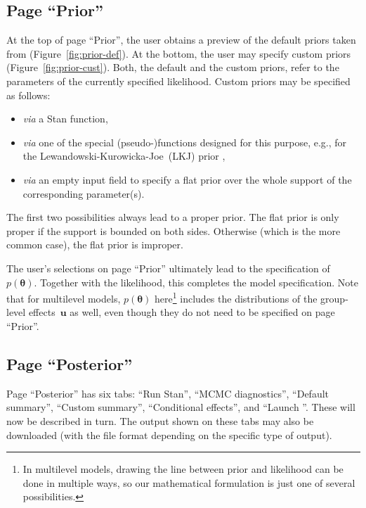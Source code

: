\subsection[Page "Prior"]{Page ``Prior''}
\label{page-prior}

At the top of page ``Prior'', the user obtains a preview of the default
priors taken from  (Figure~\ref{fig:prior-def}). At the bottom, the
user may specify custom priors (Figure~\ref{fig:prior-cust}). Both, the
default and the custom priors, refer to the parameters of the currently
specified likelihood. Custom priors may be specified as follows:
\begin{itemize}
  \item \textit{via} a Stan function,

  \item \textit{via} one of the special  (pseudo-)functions designed
  for this purpose, e.g., for the Le\-wan\-dows\-ki-Ku\-ro\-wic\-ka-Joe~(LKJ) prior
  \citep{lewandowski_generating_2009},

  \item \textit{via} an empty input field to specify a flat prior over the
  whole support of the corresponding parameter(s).
\end{itemize}
The first two possibilities always lead to a proper prior. The flat prior is
only proper if the support is bounded on both sides. Otherwise (which is the
more common case), the flat prior is improper.

The user's selections on page ``Prior'' ultimately lead to the specification
of $p(\boldsymbol{\theta})$. Together with the likelihood, this completes the model
specification. Note that for multilevel models, $p(\boldsymbol{\theta})$ here\footnote{In
multilevel models, drawing the line between prior and likelihood can be done
in multiple ways, so our mathematical formulation is just one of several
possibilities.} includes the distributions of the group-level effects~$\boldsymbol{u}$
as well, even though they do not need to be specified on page ``Prior''.

\subsection[Page "Posterior"]{Page ``Posterior''}
\label{page-posterior}

Page ``Posterior'' has six tabs: ``Run Stan'', ``MCMC
diagnostics'', ``Default summary'', ``Custom summary'',
``Conditional effects'', and ``Launch ''.
These will now be described in turn. The output shown on these tabs may also
be downloaded (with the file format depending on the specific type of output).

